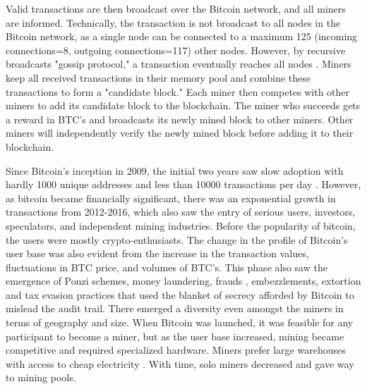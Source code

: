 \documentclass[preprint,12pt]{elsarticle}
\begin{document}
Valid transactions are then broadcast over the Bitcoin network, and all miners are informed. Technically, the transaction is not broadcast to all nodes in the Bitcoin network, as a single node can be connected to a maximum 125 (incoming connections=8, outgoing connections=117) other nodes. However, by recursive broadcasts "gossip protocol," a transaction eventually reaches all nodes \cite{park2019nodes, monrat2019survey}. Miners keep all received transactions in their memory pool and combine these transactions to form a "candidate block." Each miner then competes with other miners to add its candidate block to the blockchain. The miner who succeeds gets a reward in BTC's and broadcasts its newly mined block to other miners. Other miners will independently verify the newly mined block before adding it to their blockchain. 


Since Bitcoin's inception in 2009, the initial two years saw slow adoption with hardly 1000 unique addresses and less than 10000 transactions per day \cite{park2019nodes, GHOSH2020102635}. However, as bitcoin became financially significant, there was an exponential growth in transactions from 2012-2016, which also saw the entry of serious users, investors, speculators, and independent mining industries. Before the popularity of bitcoin, the users were mostly crypto-enthusiasts. The change in the profile of Bitcoin's user base was also evident from the increase in the transaction values, fluctuations in BTC price, and volumes of BTC's. This phase also saw the emergence of Ponzi schemes, money laundering, frauds \cite{bohme2015bitcoin}, embezzlements, extortion \cite{reyes2019method} and tax evasion \cite{toyoda2019novel} practices that used the blanket of secrecy afforded by Bitcoin to mislead the audit trail. There emerged a diversity even amongst the miners in terms of geography and size. When Bitcoin was launched, it was feasible for any participant to become a miner, but as the user base increased, mining became competitive and required specialized hardware. Miners prefer large warehouses with access to cheap electricity \cite{alqassem2018anti}. With time, solo miners decreased and gave way to mining pools. 
\end{document}
